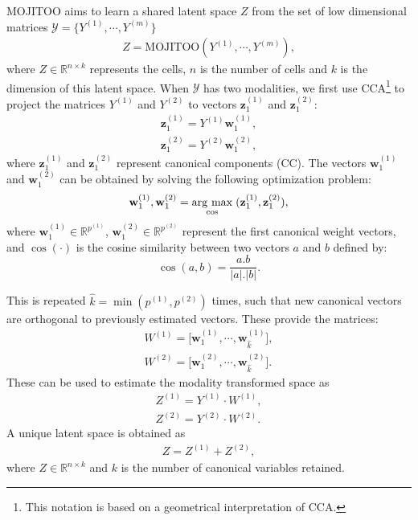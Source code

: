 MOJITOO aims to learn a shared latent space $Z$ from the set of low dimensional matrices   $\mathcal{Y}=\{Y^{(1)},\cdots,Y^{(m)}\}$
\begin{align}
    Z = \text{MOJITOO}(Y^{(1)}, \cdots, Y^{(m)}),
\end{align}
where $Z \in \mathbb{R}^{n\times k}$ represents the cells, $n$ is the number of cells and $k$ is the dimension of this latent space. When $\mathcal{Y}$ has two modalities, we first use CCA\footnote{This notation is based on a geometrical interpretation of CCA.} to project the matrices $Y^{(1)}$ and $Y^{(2)}$ to vectors ${\mathbf z_1^{(1)}}$ and ${\mathbf z_1^{(2)}}$:
\begin{equation}
\begin{split}
{\mathbf z_1^{(1)}}=Y^{(1)} {\mathbf w_1^{(1)}}, \\
{\mathbf z_1^{(2)}}=Y^{(2)} {\mathbf w_1^{(2)}},
\end{split}
\end{equation}
where ${\mathbf z_1^{(1)}}$ and ${\mathbf z_1^{(2)}}$ represent canonical components (CC). The vectors ${\mathbf w_1^{(1)}}$ and ${\mathbf w_1^{(2)}}$ can be obtained by solving the following optimization problem:
\begin{equation}
    \mathbf w_1^{(1)}, \mathbf w_1^{(2)} = \underset{\cos}{\operatorname{arg}\,\operatorname{max}}\;(\mathbf z_1^{(1)}, \mathbf z_1^{(2)}),
\end{equation}
where ${\mathbf w_1^{(1)}}\in\mathbb{R}^{p^{(1)}}$, ${\mathbf w_1^{(2)}}\in \mathbb{R}^{p^{(2)}}$ represent the first canonical weight vectors, and $\cos(\cdot)$ is the cosine similarity between two vectors $a$ and $b$ defined by:
\begin{equation}
    \cos(a,b)=\frac{a.b}{|a|.|b|}.
\end{equation}

This is repeated $\hat{k}=\min(p^{(1)}, p^{(2)})$ times, such that new canonical vectors are orthogonal to previously estimated vectors. These provide the matrices:
\begin{equation}
    \begin{split}
      W^{(1)} = \Big[ {\mathbf w}_1^{(1)},\cdots,{\mathbf w}_{\hat{k}}^{(1)}\Big], \\
      W^{(2)} = \Big[ {\mathbf w}_1^{(2)},\cdots,{\mathbf w}_{\hat{k}}^{(2)}\Big].
    \end{split}
\end{equation}
These can be used to estimate the modality transformed space as
\begin{equation}
    \begin{split}
      Z^{(1)}=Y^{(1)}\cdot W^{(1)}, \\
      Z^{(2)}=Y^{(2)}\cdot W^{(2)}.
    \end{split}
\end{equation}
A unique latent space is obtained as
\begin{align}
Z = Z^{(1)} + Z^{(2)},
\end{align}
where $Z\in\mathbb{R}^{n\times {k}}$ and ${k}$ is the number of canonical variables retained. 



